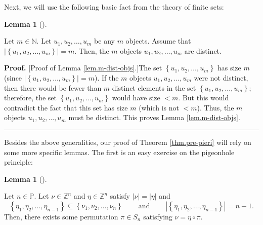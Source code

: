 \documentclass
[numbers=enddot,12pt,final,onecolumn,notitlepage,english]{scrartcl}%
\theoremstyle{definition}
\newtheorem{lem}[theo]{Lemma}
\newenvironment{lemma}[1][]
{\begin{lem}[#1]\begin{leftbar}}
{\end{leftbar}\end{lem}}
\newenvironment{proof}[1][Proof]{\noindent\textbf{#1.} }{\ \rule{0.5em}{0.5em}}
\newenvironment{verlong}{}{}
\begin{document}
\begin{verlong}
Next, we will use the following basic fact from the theory of finite sets:

\begin{lemma}
\label{lem.m-dist-objs}Let $m\in\mathbb{N}$. Let $u_{1},u_{2},\ldots,u_{m}$ be
any $m$ objects. Assume that $\left\vert \left\{  u_{1},u_{2},\ldots
,u_{m}\right\}  \right\vert =m$. Then, the $m$ objects $u_{1},u_{2}%
,\ldots,u_{m}$ are distinct.
\end{lemma}

\begin{proof}
[Proof of Lemma \ref{lem.m-dist-objs}.]The set $\left\{  u_{1},u_{2}%
,\ldots,u_{m}\right\}  $ has size $m$ (since $\left\vert \left\{  u_{1}%
,u_{2},\ldots,u_{m}\right\}  \right\vert =m$). If the $m$ objects $u_{1}%
,u_{2},\ldots,u_{m}$ were not distinct, then there would be fewer than $m$
distinct elements in the set $\left\{  u_{1},u_{2},\ldots,u_{m}\right\}  $;
therefore, the set $\left\{  u_{1},u_{2},\ldots,u_{m}\right\}  $ would have
size $<m$. But this would contradict the fact that this set has size $m$
(which is not $<m$). Thus, the $m$ objects $u_{1},u_{2},\ldots,u_{m}$ must be
distinct. This proves Lemma \ref{lem.m-dist-objs}.
\end{proof}
\end{verlong}

Besides the above generalities, our proof of Theorem \ref{thm.pre-pieri} will
rely on some more specific lemmas. The first is an easy exercise on the
pigeonhole principle:

\begin{lemma}
\label{lem.nu-eta}Let $n\in\mathbb{P}$. Let $\nu\in\mathbb{Z}^{n}$ and
$\eta\in\mathbb{Z}^{n}$ satisfy $\left\vert \nu\right\vert =\left\vert
\eta\right\vert $ and%
\[
\left\{  \eta_{1},\eta_{2},\ldots,\eta_{n-1}\right\}  \subseteq\left\{
\nu_{1},\nu_{2},\ldots,\nu_{n}\right\}  \ \ \ \ \ \ \ \ \ \ \text{and}%
\ \ \ \ \ \ \ \ \ \ \left\vert \left\{  \eta_{1},\eta_{2},\ldots,\eta
_{n-1}\right\}  \right\vert =n-1.
\]
Then, there exists some permutation $\pi\in S_{n}$ satisfying $\nu=\eta
\circ\pi$.
\end{lemma}
\end{document}
